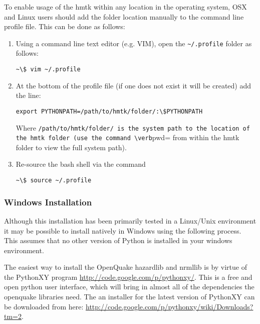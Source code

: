 To enable usage of the hmtk within any location in the operating system, OSX and Linux users should add the folder location manually to the command line profile file. This can be done as follows:

\begin{enumerate}
\item Using a command line text editor (e.g. VIM), open the \verb=~/.profile= folder as follows:

\begin{Verbatim}[frame=single, commandchars=\\\{\}, fontsize=\scriptsize]
~\$ vim ~/.profile
\end{Verbatim}

\item At the bottom of the profile file (if one does not exist it will be created) add the line:

\begin{Verbatim}[frame=single, commandchars=\\\{\}, fontsize=\scriptsize]
export PYTHONPATH=/path/to/hmtk/folder/:\$PYTHONPATH
\end{Verbatim}

Where \verb=/path/to/hmtk/folder/ is the system path to the location of the hmtk folder (use the command \verb=pwd= from within the hmtk folder to view the full system path).

\item Re-source the bash shell via the command

\begin{Verbatim}[frame=single, commandchars=\\\{\}, fontsize=\scriptsize]
~\$ source ~/.profile
\end{Verbatim}
 
\end{enumerate}

\subsubsection{Windows Installation}

Although this installation has been primarily tested in a Linux/Unix environment it may be possible to install natively in Windows using the following process. This assumes that no other version of Python is installed in your windows environment.

The easiest way to install the OpenQuake hazardlib and nrmllib is by virtue of the PythonXY program \href{http://code.google.com/p/pythonxy/}{http://code.google.com/p/pythonxy/}. This is a free and open python user interface, which will bring in almost all of the dependencies the openquake libraries need. The an installer for the latest version of PythonXY can be downloaded from here: \href{http://code.google.com/p/pythonxy/wiki/Downloads?tm=2}{http://code.google.com/p/pythonxy/wiki/Downloads?tm=2}.

